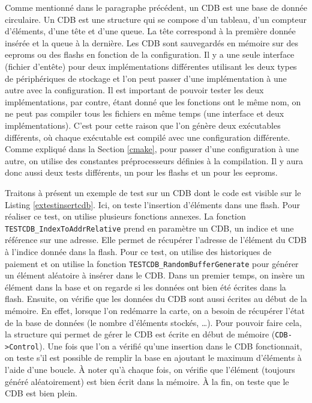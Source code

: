 \documentclass[a4paper]{article}
\begin{document}
Comme mentionné dans le paragraphe précédent, un CDB est une base de donnée
circulaire. Un CDB est une structure qui se compose d'un tableau, d'un compteur
d'éléments, d'une tête et d'une queue. La tête correspond à la première donnée
insérée et la queue à la dernière. Les CDB sont sauvegardés en mémoire sur des
eeproms ou des flashs en fonction de la configuration. Il y a une seule
interface (fichier d'entête) pour deux implémentations différentes utilisant les
deux types de périphériques de stockage et l'on peut passer d'une implémentation à
une autre avec la configuration. Il est important de pouvoir tester les deux
implémentations, par contre, étant donné que les fonctions ont le même nom, on
ne peut pas compiler tous les fichiers en même temps (une interface et deux
implémentations). C'est pour cette raison que l'on génère deux exécutables
différents, où chaque exécutable est compilé avec une configuration différente.
Comme expliqué dans la Section \ref{cmake}, pour passer d'une configuration à
une autre, on utilise des constantes préprocesseurs définies à la compilation.
Il y aura donc aussi deux tests différents, un pour les flashs et un pour les
eeproms.

Traitons à présent un exemple de test sur un CDB dont le code est visible sur le
Listing \ref{extestinsertcdb}. Ici, on teste l'insertion d'éléments dans une
flash. Pour réaliser ce test, on utilise plusieurs fonctions annexes. La
fonction \verb|TESTCDB_IndexToAddrRelative| prend en paramètre un CDB, un indice
et une référence sur une adresse. Elle permet de récupérer l'adresse de
l'élément du CDB à l'indice donnée dans la flash. Pour ce test, on utilise des
historiques de paiement et on utilise la fonction
\verb|TESTCDB_RandomBufferGenerate| pour générer un élément aléatoire à insérer
dans le CDB. Dans un premier temps, on insère un élément dans la base et on
regarde si les données ont bien été écrites dans la flash. Ensuite, on vérifie
que les données du CDB sont aussi écrites au début de la mémoire. En effet,
lorsque l'on redémarre la carte, on a besoin de récupérer l'état de la base de
données (le nombre d'éléments stockés, \dots). Pour pouvoir faire cela, la
structure qui permet de gérer le CDB est écrite en début de mémoire
(\verb|CDB->Control|). Une fois que l'on a vérifié qu'une insertion dans le CDB
fonctionnait, on teste s'il est possible de remplir la base en ajoutant le
maximum d'éléments à l'aide d'une boucle. À noter qu'à chaque fois, on vérifie
que l'élément (toujours généré aléatoirement) est bien écrit dans la mémoire. À
la fin, on teste que le CDB est bien plein.
\end{document}
